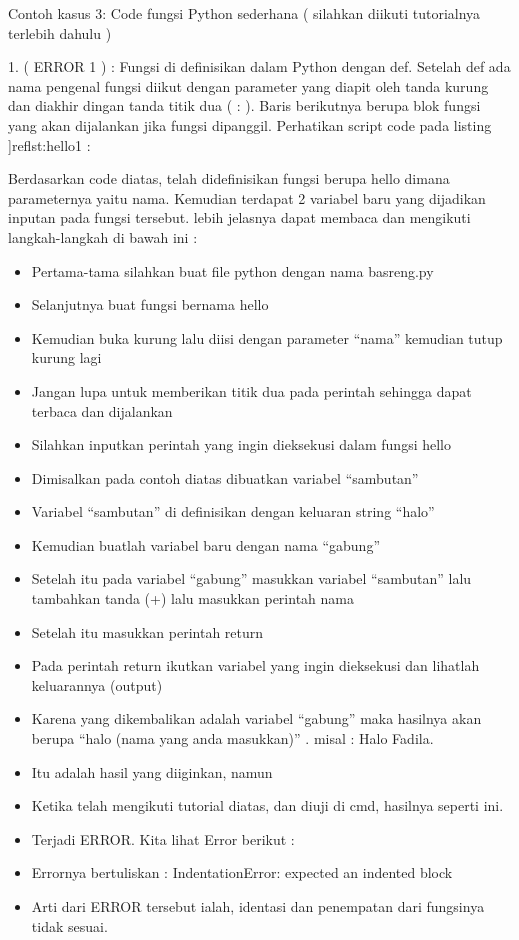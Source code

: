 Contoh kasus 3: Code fungsi Python sederhana ( silahkan diikuti tutorialnya terlebih dahulu )

1. ( ERROR 1 ) : Fungsi di definisikan dalam Python dengan def. Setelah def ada nama pengenal fungsi diikut dengan parameter yang diapit oleh tanda kurung dan diakhir dingan tanda titik dua ( : ). Baris berikutnya berupa blok fungsi yang akan dijalankan jika fungsi dipanggil. Perhatikan script code pada listing ]ref{lst:hello1} :


Berdasarkan code diatas, telah didefinisikan fungsi berupa hello dimana parameternya yaitu nama. Kemudian terdapat 2 variabel baru yang dijadikan inputan pada fungsi tersebut. lebih jelasnya dapat membaca dan mengikuti langkah-langkah di bawah ini : 
\begin{itemize}
\item Pertama-tama silahkan buat file python dengan nama basreng.py 
\item Selanjutnya buat fungsi bernama hello 
\item Kemudian buka kurung lalu diisi dengan parameter “nama” kemudian tutup kurung lagi 
\item Jangan lupa untuk memberikan titik dua pada perintah sehingga dapat terbaca dan dijalankan 
\item Silahkan inputkan perintah yang ingin dieksekusi dalam fungsi hello 
\item Dimisalkan pada contoh diatas dibuatkan variabel “sambutan” 
\item Variabel “sambutan” di definisikan dengan keluaran string “halo” 
\item Kemudian buatlah variabel baru dengan nama “gabung” 
\item Setelah itu pada variabel “gabung” masukkan variabel “sambutan” lalu tambahkan tanda (+) lalu masukkan perintah nama
\item Setelah itu masukkan perintah return 
\item Pada perintah return ikutkan variabel yang ingin dieksekusi dan lihatlah keluarannya (output) 
\item Karena yang dikembalikan adalah variabel “gabung” maka hasilnya akan berupa “halo (nama yang anda masukkan)” . misal : Halo Fadila. 
\item Itu adalah hasil yang diiginkan, namun 
\item Ketika telah mengikuti tutorial diatas, dan diuji di cmd, hasilnya seperti ini. 
\item Terjadi ERROR. Kita lihat Error berikut : 
\item Errornya bertuliskan : IndentationError: expected an indented block
\item Arti dari ERROR tersebut ialah, identasi dan penempatan dari fungsinya tidak sesuai.  
\end{itemize}

